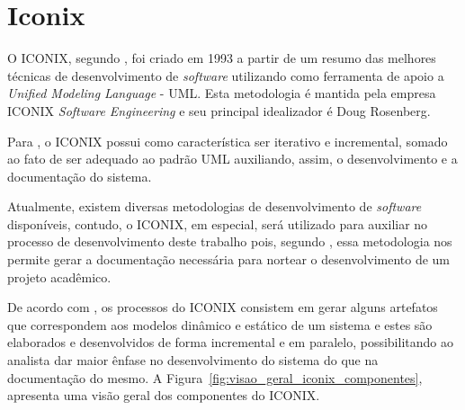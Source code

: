 \section{Iconix}

\par O ICONIX, segundo , foi criado em 1993 a partir de um resumo das melhores técnicas de desenvolvimento de \textit{software} utilizando como ferramenta de apoio a \textit{Unified Modeling Language} - UML\footnotemark[3]. Esta metodologia é mantida pela empresa ICONIX \textit{Software Engineering} e seu principal idealizador é Doug Rosenberg.



\par Para , o ICONIX possui como característica ser iterativo e incremental, somado ao fato de ser adequado ao padrão UML auxiliando, assim, o desenvolvimento e a documentação do sistema.

\par Atualmente, existem diversas metodologias de desenvolvimento de \textit{software} disponíveis, contudo, o ICONIX, em especial, será utilizado para auxiliar no processo de desenvolvimento deste trabalho pois, segundo
, essa metodologia nos permite gerar a documentação necessária para nortear o desenvolvimento de um projeto acadêmico.

\par De acordo com , os processos do ICONIX consistem em gerar alguns artefatos que correspondem aos modelos dinâmico e estático de um sistema e estes são elaborados e desenvolvidos de forma incremental e em paralelo, possibilitando ao analista dar maior ênfase no desenvolvimento do sistema do que na documentação do mesmo. A Figura~\ref{fig:visao_geral_iconix_componentes}, apresenta uma visão geral dos componentes do ICONIX.

